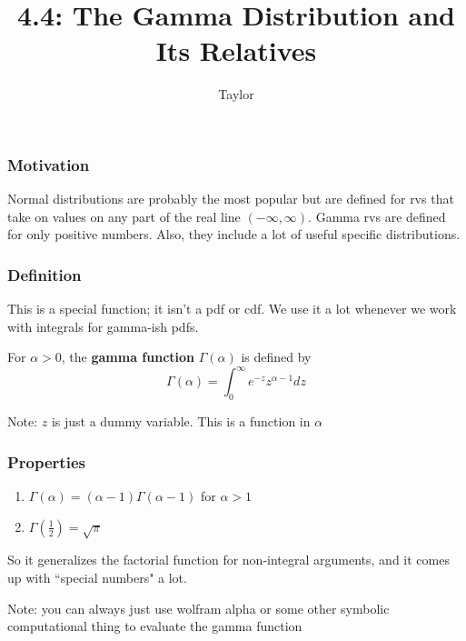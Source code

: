 \documentclass{beamer}
\title["4.4"]{4.4: The Gamma Distribution and Its Relatives}
\author{Taylor}
\institute[UVA] 
{
University of Virginia \\
\medskip
\textit{} 
}
\date{}
\begin{document}

\begin{frame}
\titlepage 
\end{frame}

\begin{frame}
\frametitle{Motivation}

Normal distributions are probably the most popular but are defined for rvs that take on values on any part of the real line $(-\infty, \infty)$. Gamma rvs are defined for only positive numbers. Also, they include a lot of useful specific distributions. 


\end{frame}


\begin{frame}
\frametitle{Definition}

This is a special function; it isn't a pdf or cdf. We use it a lot whenever we work with integrals for gamma-ish pdfs.
\newline

\begin{definition}
For $\alpha > 0$, the \textbf{gamma function} $\Gamma(\alpha)$ is defined by
\[
\Gamma(\alpha) = \int_{0}^{\infty} e^{-z} z^{\alpha - 1} dz
\]
\end{definition}

Note: $z$ is just a dummy variable. This is a function in $\alpha$
\newline

\end{frame}


\begin{frame}
\frametitle{Properties}

\begin{enumerate}
\item $\Gamma(\alpha) = (\alpha - 1) \Gamma(\alpha-1)$ for $\alpha > 1$ 
\item $\Gamma(\frac{1}{2}) = \sqrt{\pi}$
\end{enumerate}

So it generalizes the factorial function for non-integral arguments, and it comes up with ``special numbers" a lot. 
\newline

Note: you can always just use wolfram alpha or some other symbolic computational thing to evaluate the gamma function
\end{frame}
\end{document}
